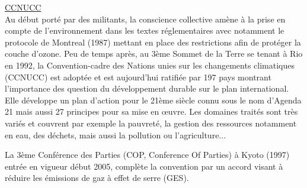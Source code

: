 \href{http://unfccc.int/essential_background/convention/status_of_ratification/items/2631.php}{CCNUCC}\\
Au début porté par des militants, la conscience collective amène à la prise en compte de
l’environnement dans les textes réglementaires avec notamment le protocole de Montreal
(1987) mettant en place des restrictions afin de protéger la couche d’ozone. Peu de temps
après, au 3ème Sommet de la Terre se tenant à Rio en 1992, la Convention-cadre des Nations
unies sur les changements climatiques (CCNUCC) est adoptée et est aujourd’hui ratifiée par 197
pays montrant l’importance des question du développement durable sur le plan international.
Elle développe un plan d’action pour le 21ème siècle connu sous le nom d’Agenda 21
mais aussi 27 principes pour sa mise en œuvre. Les domaines traités sont très variés
et couvrent par exemple la pauvreté, la gestion des ressources notamment en eau, des déchets,
mais aussi la pollution ou l’agriculture...

La 3ème Conférence des Parties (COP, Conference Of Parties) à Kyoto (1997) entrée
en vigueur début 2005, complète la convention par un accord visant à réduire les
émissions de gaz à effet de serre (GES).

